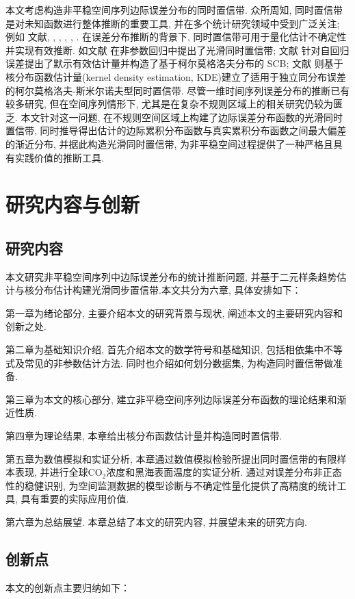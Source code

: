 \documentclass[a4paper,openay,14pt]{ctexbook}
\numberwithin{equation}{section}
\numberwithin{lem}{section}
\begin{document}
本文考虑构造非平稳空间序列边际误差分布的同时置信带. 众所周知,  同时置信带是对未知函数进行整体推断的重要工具, 并在多个统计研究领域中受到广泛关注; 例如
文献\cite{wang2013smooth}, \cite{gu2014simultaneous}, \cite{wang2014oracally}, \cite{cao2016oracle}, \cite{zhang2018smooth}, \cite{wang2022oracle}.
在误差分布推断的背景下, 同时置信带可用于量化估计不确定性并实现有效推断. 如文献\cite{gu2021smooth} 在非参数回归中提出了光滑同时置信带; 文献\cite{wang2014oracally} 针对自回归误差提出了默示有效估计量并构造了基于柯尔莫格洛夫分布的 SCB; 文献\cite{wang2022oracle} 则基于核分布函数估计量(kernel density estimation, KDE)建立了适用于独立同分布误差的柯尔莫格洛夫-斯米尔诺夫型同时置信带. 尽管一维时间序列误差分布的推断已有较多研究, 但在空间序列情形下, 尤其是在复杂不规则区域上的相关研究仍较为匮乏. 本文针对这一问题, 在不规则空间区域上构建了边际误差分布函数的光滑同时置信带, 同时推导得出估计的边际累积分布函数与真实累积分布函数之间最大偏差的渐近分布, 并据此构造光滑同时置信带, 为非平稳空间过程提供了一种严格且具有实践价值的推断工具.


\section{研究内容与创新}
\subsection{研究内容}
本文研究非平稳空间序列中边际误差分布的统计推断问题,  并基于二元样条趋势估计与核分布估计构建光滑同步置信带.本文共分为六章, 具体安排如下：

第一章为绪论部分,  主要介绍本文的研究背景与现状,  阐述本文的主要研究内容和创新之处. 

第二章为基础知识介绍,  首先介绍本文的数学符号和基础知识, 包括相依集中不等式及常见的非参数估计方法. 同时也介绍如何划分数据集, 为构造同时置信带做准备. 

第三章为本文的核心部分,   建立非平稳空间序列边际误差分布函数的理论结果和渐近性质.

第四章为理论结果, 本章给出核分布函数估计量并构造同时置信带. 

第五章为数值模拟和实证分析, 本章通过数值模拟检验所提出同时置信带的有限样本表现, 并进行全球CO$_2$浓度和黑海表面温度的实证分析. 通过对误差分布非正态性的稳健识别, 为空间监测数据的模型诊断与不确定性量化提供了高精度的统计工具, 具有重要的实际应用价值. 

第六章为总结展望. 本章总结了本文的研究内容,  并展望未来的研究方向. 

\subsection{创新点}
本文的创新点主要归纳如下：
\end{document}
